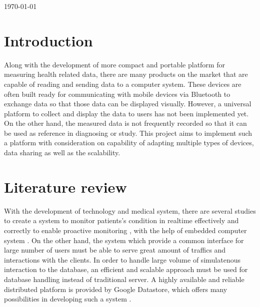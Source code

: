 \begin{titlepage}


{\large \today}\\[2cm] %



\vfill %

\end{titlepage}

\linespread{1.25}
\section{Introduction}
Along with the development of more compact and portable platform for measuring health related data, there are many
products on the market that are capable of reading and sending data to a computer system. These devices are often built
ready for communicating with mobile devices via Bluetooth to exchange data so that those data can be displayed visually.
However, a universal platform to collect and display the data to users has not been implemented yet. On the other hand,
the measured data is not frequently recorded so that it can be used as reference in diagnosing or study.  This project
aims to implement such a platform with consideration on capability of adapting multiple types of devices, data sharing
as well as the scalability.

\section{Literature review}
With the development of technology and medical system, there are several studies to create a system to monitor
patients's condition in realtime effectively and correctly to enable proactive monitoring \cite{5076774}, with the help
of embedded computer system \cite{4062461}. On the other hand, the system which provide a common interface for large
number of users must be able to serve great amount of traffics and interactions with the clients.  In order to handle
large volume of simulatenous interaction to the database, an efficient and scalable approach must be used for database
handling instead of traditional server. A highly available and reliable distributed platform is provided by Google
Datastore, which offers many possibilities in developing such a system \cite{7059154}.

